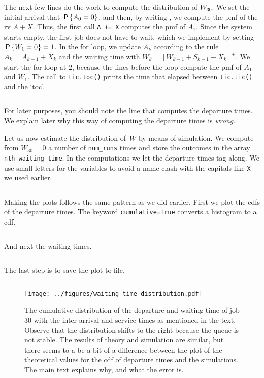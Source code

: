 \documentclass[stochastic-or.tex]{subfiles}
\begin{document}
The next few lines do the work to compute the distribution of $W_{30}$.
We set the initial arrival that $\P{A_{0} = 0}$, and  then, by writing , we compute the pmf of the rv $A+X$. Thus, the first call \texttt{A += X} computes the pmf of $A_{1}$. Since the system starts empty, the first job does not have to wait, which we implement by setting $\P{W_{1} = 0} = 1$.
In the for loop, we update $A_{k}$ according to the rule $A_{k} = A_{k-1} +X_{k}$ and the waiting time with $W_{k} = [W_{k-1} + S_{k-1} - X_{k}]^{+}$.
We start the for loop at $2$, because the lines before the loop compute the pmf of $A_{1}$ and $W_{1}$.
The call to \texttt{tic.toc()} prints the time that elapsed between \texttt{tic.tic()} and the `toc'.
\inputminted[firstline=32, lastline=43]{python}{../code/waiting_time_distribution.py} %

For later purposes, you should note the line that computes the departure times. We explain later why this way of computing the departure times is \emph{wrong}.

Let us now estimate the distribution of~$W$ by means of simulation.
We compute from $W_{30}=0$ a number of \texttt{num_runs} times and store the outcomes in the array \texttt{nth_waiting_time}.
In the computations we let the departure times tag along.
We use small letters for the variables to avoid a name clash with the capitals like \texttt{X} we used earlier.
\inputminted[firstline=47, lastline=67]{python}{../code/waiting_time_distribution.py} %


Making the plots follows the same pattern as we did earlier.
First we plot the cdfs of the departure times.
The keyword \texttt{cumulative=True} converts a histogram to a cdf.
\inputminted[firstline=71, lastline=88]{python}{../code/waiting_time_distribution.py} %
\noindent
And next the waiting times.
\inputminted[firstline=92, lastline=107]{python}{../code/waiting_time_distribution.py} %
The last step is to save the plot to file.
\inputminted[firstline=111, lastline=112]{python}{../code/waiting_time_distribution.py} %



\begin{figure}[t]
\centering
\texttt{[image: ../figures/waiting\_time\_distribution.pdf]}
\caption{The cumulative distribution of the departure and waiting time of job $30$ with the inter-arrival and service times as mentioned in the text.
Observe that the distribution shifts to the right because the queue is not stable.
The results of theory and simulation are similar, but there seems to a be a bit of a difference between the plot of the theoretical values for the cdf of departure times and the simulations. The main text explains why, and what the error is.}
\label{fig:waitingdistribution}
\end{figure}
\end{document}
